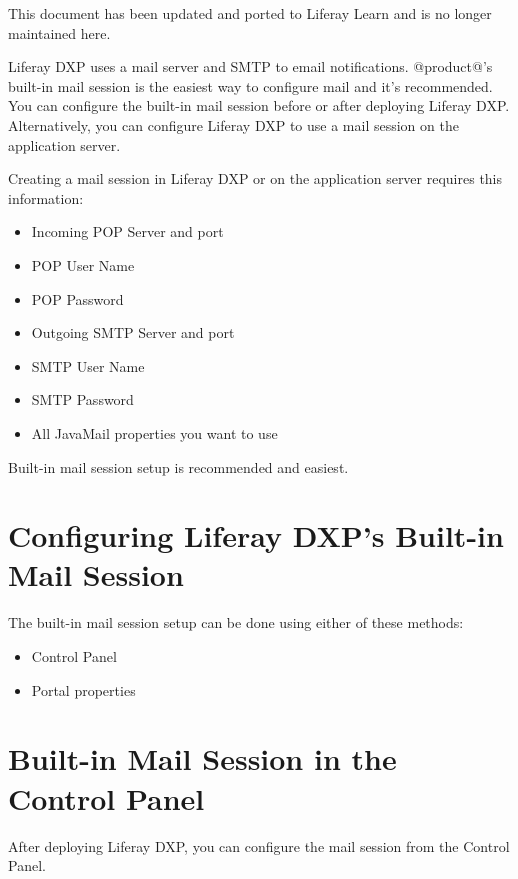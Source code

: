 {This document has been updated and ported to Liferay Learn and is no
longer maintained here.}

Liferay DXP uses a mail server and SMTP to email notifications.
@product@'s built-in mail session is the easiest way to configure mail
and it's recommended. You can configure the built-in mail session before
or after deploying Liferay DXP. Alternatively, you can configure Liferay
DXP to use a mail session on the application server.

Creating a mail session in Liferay DXP or on the application server
requires this information:

\begin{itemize}
\tightlist
\item
  Incoming POP Server and port
\item
  POP User Name
\item
  POP Password
\item
  Outgoing SMTP Server and port
\item
  SMTP User Name
\item
  SMTP Password
\item
  All JavaMail properties you want to use
\end{itemize}

Built-in mail session setup is recommended and easiest.

\section{Configuring Liferay DXP's Built-in Mail
Session}\label{configuring-liferay-dxps-built-in-mail-session}

The built-in mail session setup can be done using either of these
methods:

\begin{itemize}
\item
  Control Panel
\item
  Portal properties
\end{itemize}

\section{Built-in Mail Session in the Control
Panel}\label{built-in-mail-session-in-the-control-panel}

After deploying Liferay DXP, you can configure the mail session from the
Control Panel.

